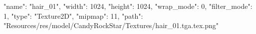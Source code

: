 {
  "name": "hair_01",
  "width": 1024,
  "height": 1024,
  "wrap_mode": 0,
  "filter_mode": 1,
  "type": "Texture2D",
  "mipmap": 11,
  "path": "Resources/res/model/CandyRockStar/Textures/hair_01.tga.tex.png"
}